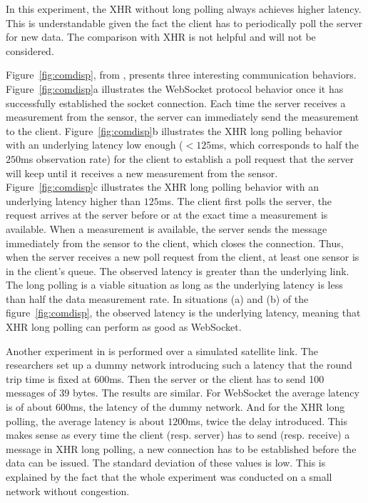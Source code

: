 \documentclass[10pt,journal,compsoc]{IEEEtran}
\newcommand{\ws}{WebSocket}
\begin{document}
In this experiment, the XHR without long polling always achieves higher latency.
This is understandable given the fact the client has to periodically poll the server for new data.
The comparison with XHR is not helpful and will not be considered.

Figure~\ref{fig:comdisp}, from \cite{communicationAndDIsplayingRealTimeDataWithWebSocket}, presents three interesting communication behaviors.
Figure~\ref{fig:comdisp}a illustrates the \ws{} protocol behavior once it has successfully established the socket connection. Each time the server receives a measurement from the sensor, the server can immediately send the measurement to the client.
Figure~\ref{fig:comdisp}b illustrates the XHR long polling behavior with an underlying latency low enough ($< 125 $ms, which corresponds to half the $250$ms observation rate) for the client to establish a poll request that the server will keep until it receives a new measurement from the sensor. %
Figure~\ref{fig:comdisp}c illustrates the XHR long polling behavior with an underlying latency higher than $125$ms.
The client first polls the server, the request arrives at the server before or at the exact time a measurement is available.
When a measurement is available, the server sends the message immediately from the sensor to the client, which closes the connection.
Thus, when the server receives a new poll request from the client, at least one sensor is in the client's queue.
The observed latency is greater than the underlying link.
The long polling is a viable situation as long as the underlying latency is less than half the data measurement rate.
In  situations (a) and (b) of the figure~\ref{fig:comdisp}, the observed latency is the underlying latency, meaning that XHR long polling can perform as good as \ws{}.



Another experiment in \cite{collinalatency} is performed over a simulated satellite link.
The researchers set up a dummy network introducing such a latency that the round trip time is fixed at $600$ms.
Then the server or the client has to send 100 messages of 39 bytes. The results are similar.
For \ws{} the average latency is of about $600$ms, the latency of the dummy network. And for the XHR long polling, the average latency is about $1200$ms, twice the delay introduced.
This makes sense as every time the client (resp. server) has to send (resp. receive) a message in XHR long polling, a new connection has to be established before the data can be issued.
The standard deviation of these values is low.
This is explained by the fact that the whole experiment was conducted on a small network without congestion.
\end{document}
